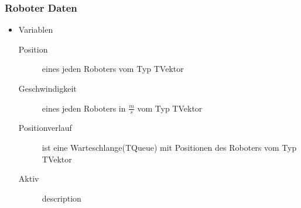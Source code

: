 \subsubsection{Roboter Daten}
\begin{itemize}
	\item Variablen
	\begin{description}
		\item[Position] eines jeden Roboters vom Typ TVektor 
		\item[Geschwindigkeit] eines jeden Roboters in $\frac{m}{s}$ vom Typ TVektor
		\item[Positionverlauf] ist eine Warteschlange(TQueue) mit Positionen des Roboters vom Typ TVektor
		\item[Aktiv] description
	\end{description}
\end{itemize}


%
%
%
